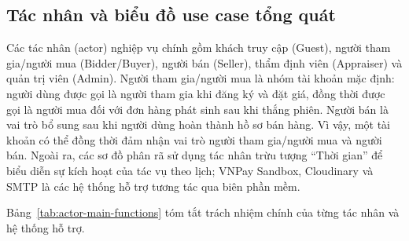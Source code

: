 \documentclass[../DoAn.tex]{subfiles}
\begin{document}
\subsection{Tác nhân và biểu đồ use case tổng quát}

Các tác nhân (actor) nghiệp vụ chính gồm khách truy cập (Guest), người tham gia/người mua (Bidder/Buyer), người bán (Seller), thẩm định viên (Appraiser) và quản trị viên (Admin). Người tham gia/người mua là nhóm tài khoản mặc định: người dùng được gọi là người tham gia khi đăng ký và đặt giá, đồng thời được gọi là người mua đối với đơn hàng phát sinh sau khi thắng phiên. Người bán là vai trò bổ sung sau khi người dùng hoàn thành hồ sơ bán hàng. Vì vậy, một tài khoản có thể đồng thời đảm nhận vai trò người tham gia/người mua và người bán. Ngoài ra, các sơ đồ phân rã sử dụng tác nhân trừu tượng ``Thời gian'' để biểu diễn sự kích hoạt của tác vụ theo lịch; VNPay Sandbox, Cloudinary và SMTP là các hệ thống hỗ trợ tương tác qua biên phần mềm.

Bảng~\ref{tab:actor-main-functions} tóm tắt trách nhiệm chính của từng tác nhân và hệ thống hỗ trợ.
\end{document}
